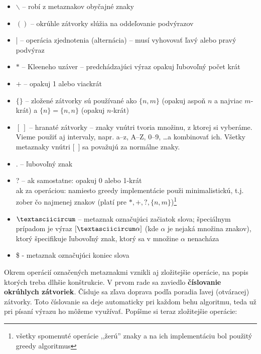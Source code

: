 \begin{itemize}
\item $\backslash$ -- robí z metaznakov obyčajné znaky
\item $()$ -- okrúhle zátvorky slúžia na oddeľovanie podvýrazov
\item | -- operácia zjednotenia (alternácia) -- musí vyhovovať ľavý alebo pravý podvýraz
\item $*$ -- Kleeneho uzáver -- predchádzajúci výraz opakuj ľubovoľný počet krát
\item $+$ -- opakuj 1 alebo viackrát
\item $\lbrace \rbrace$ -- zložené zátvorky sú používané ako $\{n,m\}$ (opakuj aspoň $n$ a najviac $m$-krát) a $\{n\}=\{n,n\}$ (opakuj $n$-krát)
\item $[~]$ -- hranaté zátvorky -- znaky vnútri tvoria množinu, z ktorej si vyberáme. Vieme použiť aj intervaly, napr. a--z, A--Z, 0--9, \dots a kombinovať ich. Všetky metaznaky vnútri [~] sa považujú za normálne znaky.
\item . -- ľubovoľný znak
\item ? -- ak samostatne: opakuj 0 alebo 1-krát \\
ak za operáciou: namiesto greedy implementácie použi minimalistickú, t.j. zober čo najmenej znakov (platí pre $*,+,?,\lbrace n,m \rbrace$)\footnote{všetky spomenuté operácie ,,žerú'' znaky a na ich implementáciu bol použitý greedy algoritmus}
\item $\textasciicircum$ -- metaznak označujúci začiatok slova; špeciálnym prípadom je výraz $[\textasciicircum\alpha]$ (kde $\alpha$ je nejaká množina znakov), ktorý špecifikuje ľubovoľný znak, ktorý sa v množine $\alpha$ nenacháza
\item \$ - metaznak označujúci koniec slova
\end{itemize}

Okrem operácií označených metaznakmi vznikli aj zložitejšie operácie, na popis ktorých treba dlhšie konštrukcie. V prvom rade sa zaviedlo \textbf{číslovanie okrúhlych zátvoriek}. Čísluje sa zľava doprava podľa poradia ľavej (otváracej) zátvorky. Toto číslovanie sa deje automaticky pri každom behu algoritmu, teda už pri písaní výrazu ho môžeme využívať. Popíšme si teraz zložitejšie operácie:

